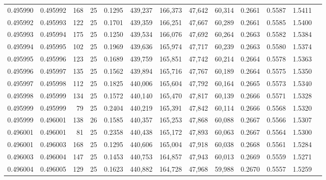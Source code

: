 \begin{tabular}{rrrrrrrrrrrrr}
0.495990 & 0.495992 &   168 &  25 &                                     0.1295 & 439,237 & 166,373 &  47,642 &  60,314 & 0.2661 & 0.5587 & 1.5411 \\
0.495992 & 0.495993 &   122 &  25 &                                     0.1701 & 439,359 & 166,251 &  47,667 &  60,289 & 0.2661 & 0.5585 & 1.5400 \\
0.495993 & 0.495994 &   175 &  25 &                                     0.1250 & 439,534 & 166,076 &  47,692 &  60,264 & 0.2663 & 0.5582 & 1.5384 \\
0.495994 & 0.495995 &   102 &  25 &                                     0.1969 & 439,636 & 165,974 &  47,717 &  60,239 & 0.2663 & 0.5580 & 1.5374 \\
0.495995 & 0.495996 &   123 &  25 &                                     0.1689 & 439,759 & 165,851 &  47,742 &  60,214 & 0.2664 & 0.5578 & 1.5363 \\
0.495996 & 0.495997 &   135 &  25 &                                     0.1562 & 439,894 & 165,716 &  47,767 &  60,189 & 0.2664 & 0.5575 & 1.5350 \\
0.495997 & 0.495998 &   112 &  25 &                                     0.1825 & 440,006 & 165,604 &  47,792 &  60,164 & 0.2665 & 0.5573 & 1.5340 \\
0.495998 & 0.495999 &   134 &  25 &                                     0.1572 & 440,140 & 165,470 &  47,817 &  60,139 & 0.2666 & 0.5571 & 1.5328 \\
0.495999 & 0.495999 &    79 &  25 &                                     0.2404 & 440,219 & 165,391 &  47,842 &  60,114 & 0.2666 & 0.5568 & 1.5320 \\
0.495999 & 0.496001 &   138 &  26 &                                     0.1585 & 440,357 & 165,253 &  47,868 &  60,088 & 0.2667 & 0.5566 & 1.5307 \\
0.496001 & 0.496001 &    81 &  25 &                                     0.2358 & 440,438 & 165,172 &  47,893 &  60,063 & 0.2667 & 0.5564 & 1.5300 \\
0.496001 & 0.496003 &   168 &  25 &                                     0.1295 & 440,606 & 165,004 &  47,918 &  60,038 & 0.2668 & 0.5561 & 1.5284 \\
0.496003 & 0.496004 &   147 &  25 &                                     0.1453 & 440,753 & 164,857 &  47,943 &  60,013 & 0.2669 & 0.5559 & 1.5271 \\
0.496004 & 0.496005 &   129 &  25 &                                     0.1623 & 440,882 & 164,728 &  47,968 &  59,988 & 0.2670 & 0.5557 & 1.5259 \\

\end{tabular}
